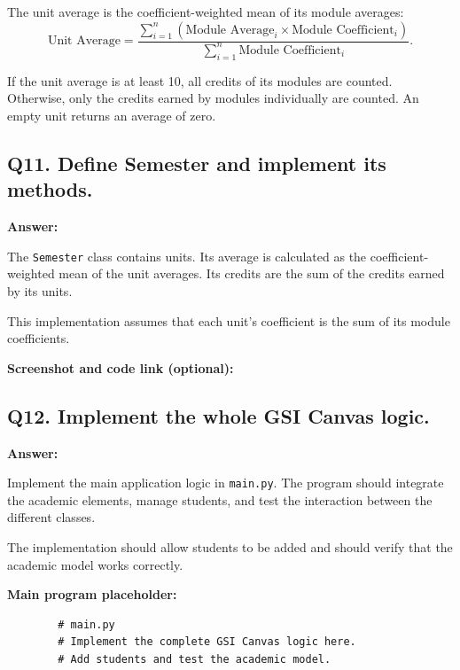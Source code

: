 \documentclass[a4paper,12pt]{article}
\begin{document}
	The unit average is the coefficient-weighted mean of its module averages:
	\[
	\text{Unit Average}
	=
	\frac{
		\sum_{i=1}^{n}
		\left(\text{Module Average}_i \times \text{Module Coefficient}_i\right)
	}{
		\sum_{i=1}^{n}\text{Module Coefficient}_i
	}.
	\]
	
	If the unit average is at least 10, all credits of its modules are counted. Otherwise, only the credits earned by modules individually are counted. An empty unit returns an average of zero.
	
	\subsection*{Q11. Define Semester and implement its methods.}
	
	\textbf{Answer:}
	
	The \texttt{Semester} class contains units. Its average is calculated as the coefficient-weighted mean of the unit averages. Its credits are the sum of the credits earned by its units.
	
	This implementation assumes that each unit's coefficient is the sum of its module coefficients.
	
	\textbf{Screenshot and code link (optional):}
	
	
	\subsection*{Q12. Implement the whole GSI Canvas logic.}
	
	\textbf{Answer:}
	
	Implement the main application logic in \texttt{main.py}. The program should integrate the academic elements, manage students, and test the interaction between the different classes.
	
	The implementation should allow students to be added and should verify that the academic model works correctly.
	
	\textbf{Main program placeholder:}
	
	\begin{lstlisting}
		# main.py
		# Implement the complete GSI Canvas logic here.
		# Add students and test the academic model.
	\end{lstlisting}
	
\end{document}

